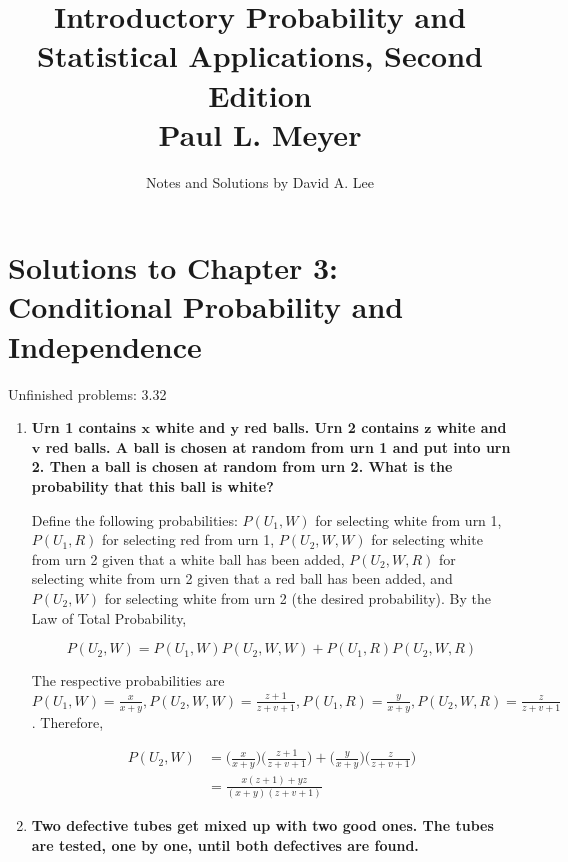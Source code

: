 \documentclass[10pt, oneside]{article}
\title{Introductory Probability and Statistical Applications, Second Edition \\
\large{Paul L. Meyer}}
\author{Notes and Solutions by David A. Lee}
\date{}							%
\begin{document}
\maketitle
\section*{Solutions to Chapter 3: Conditional Probability and Independence}

Unfinished problems: 3.32

\begin{enumerate}[label=3.\arabic*]
\itemsep0em 
\item  \begin{tcolorbox}[
  colback=Cerulean!5!white,
  colframe=Cerulean!75!black]
\textbf{Urn 1 contains $\bm{x}$ white and $\bm{y}$ red balls. Urn 2 contains $\bm{z}$ white and $\bm{v}$ red balls. A ball is chosen at random from urn 1 and put into urn 2. Then a ball is chosen at random from urn 2. What is the probability that this ball is white?}
\end{tcolorbox}

Define the following probabilities: $P(U_1, W)$ for selecting white from urn 1, $P(U_1, R)$ for selecting red from urn 1, $P(U_2, W, W)$ for selecting white from urn 2 given that a white ball has been added, $P(U_2, W, R)$ for selecting white from urn 2 given that a red ball has been added, and $P(U_2, W)$ for selecting white from urn 2 (the desired probability). By the Law of Total Probability, 

\[ P(U_2, W) = P(U_1, W) P(U_2, W, W) + P(U_1, R) P(U_2, W, R) \]

The respective probabilities are $P(U_1, W) = \frac{x}{x+y},  P(U_2, W, W) = \frac{z+1}{z+v+1}, P(U_1, R) = \frac{y}{x+y}, P(U_2, W, R) = \frac{z}{z+v+1}$. Therefore,

\begin{align*}
P(U_2, W) &= \Bigg(  \frac{x}{x+y} \Bigg)  \Bigg( \frac{z+1}{z+v+1} \Bigg) + \Bigg( \frac{y}{x+y} \Bigg) \Bigg( \frac{z}{z+v+1} \Bigg) \\
&= \boxed{ \frac{x(z+1) + yz}{(x+y) (z+v+1)} }
\end{align*}

\item  \begin{tcolorbox}[
  colback=Cerulean!5!white,
  colframe=Cerulean!75!black]
\textbf{Two defective tubes get mixed up with two good ones. The tubes are tested, one by one, until both defectives are found.}
\end{tcolorbox}


\end{enumerate}
\end{document}
